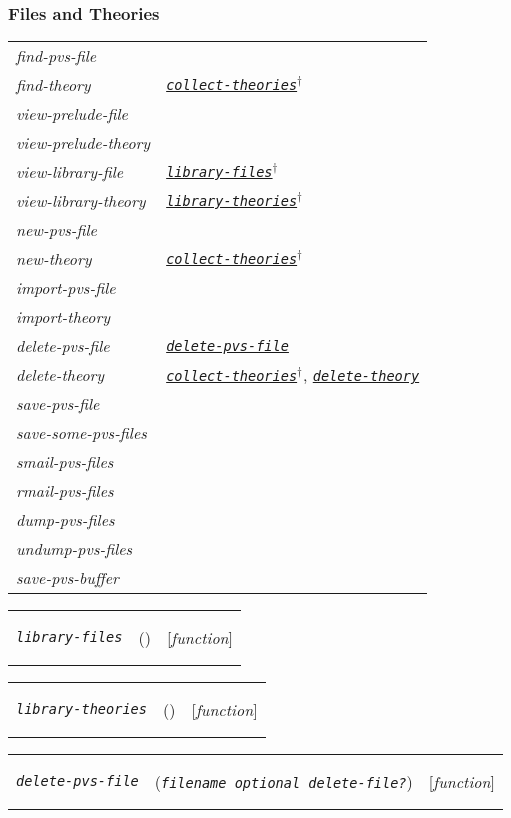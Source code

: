 \documentclass[12pt]{book}
\makeatletter
\def\ampoptional{{\smaller\sc {\smaller\smaller \&}optional\ }}
\newenvironment{function}[3]%
{\par\noindent\begin{boxedminipage}{\textwidth}%
 \par\noindent\begin{tabularx}{\linewidth}{l>{\raggedright}Xr}%
 \functionhtgt{#1}&(\texttt{\textit{#2}})&[\emph{#3}]%
 \end{tabularx}\par\flushright\begin{minipage}{.97\textwidth}}
{\end{minipage}\end{boxedminipage}}
\newcommand{\functionnm}[1]{\texttt{\textit{#1}}}
\newcommand{\functionhln}[1]{\hyperlink{#1}{\functionnm{#1}}}
\newcommand{\functionhtgt}[1]{\hypertarget{#1}{\functionnm{#1}}\index{#1@\functionnm{#1}|underline}}
\newenvironment{lispfunction}[2]%
{\begin{function}{#1}{#2}{function}}{\end{function}}
\makeatother
\begin{document}
\subsubsection{Files and Theories}
\noindent\begin{tabularx}{\linewidth}{|>{\itshape\ttfamily}l|>{\raggedright\arraybackslash}X|}\hline
  find-pvs-file & \\
  find-theory & \functionhln{collect-theories}$^\dagger$ \\
  view-prelude-file & \\
  view-prelude-theory & \\
  view-library-file & \functionhln{library-files}$^\dagger$ \\
  view-library-theory & \functionhln{library-theories}$^\dagger$ \\
  new-pvs-file & \\
  new-theory & \functionhln{collect-theories}$^\dagger$ \\
  import-pvs-file & \\
  import-theory & \\
  delete-pvs-file & \functionhln{delete-pvs-file} \\
  delete-theory & \functionhln{collect-theories}$^\dagger$,
                  \functionhln{delete-theory} \\
  save-pvs-file & \\
  save-some-pvs-files & \\
  smail-pvs-files & \\
  rmail-pvs-files & \\
  dump-pvs-files & \\
  undump-pvs-files & \\
  save-pvs-buffer & \\ \hline
\end{tabularx}

\begin{lispfunction}{library-files}{}
\end{lispfunction}

\begin{lispfunction}{library-theories}{}
\end{lispfunction}

\begin{lispfunction}{delete-pvs-file}{filename \ampoptional delete-file?}
\end{lispfunction}
\end{document}
